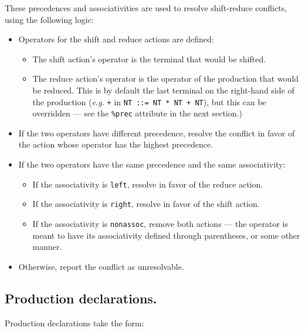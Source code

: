 \documentclass[12pt,english,twoside]{report}
\begin{document}
These precedences and associativities are used to resolve shift-reduce
conflicts, using the following logic:

\begin{itemize}
\item Operators for the shift and reduce actions are defined:

\begin{itemize}
\item The shift action's operator is the terminal that would be shifted.
\item The reduce action's operator is the operator of the production that
would be reduced. This is by default the last terminal on the right-hand
side of the production (\emph{e.g.} \texttt{+} in \texttt{NT ::= NT
{*} NT + NT}), but this can be overridden --- see the \texttt{\%prec}
attribute in the next section.)
\end{itemize}
\item If the two operators have different precedence, resolve the conflict
in favor of the action whose operator has the highest precedence.
\item If the two operators have the same precedence and the same associativity:

\begin{itemize}
\item If the associativity is \texttt{left}, resolve in favor of the reduce
action.
\item If the associativity is \texttt{right}, resolve in favor of the shift
action.
\item If the associativity is \texttt{nonassoc}, remove both actions ---
the operator is meant to have its associativity defined through parentheses,
or some other manner.
\end{itemize}
\item Otherwise, report the conflict as unresolvable.
\end{itemize}

\subsection{\label{sub:Production-declarations.}Production declarations.}

Production declarations take the form:
\end{document}
